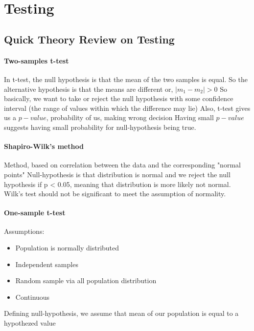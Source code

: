 \documentclass{article}
\begin{document}
\section{Testing}



\subsection{Quick Theory Review on Testing}
\paragraph{Two-samples t-test\newline}
In t-test, the null hypothesis is that the mean of the two samples is equal.
So the alternative hypothesis is that the means are different or, \(|m_1 - m_2| > 0\)
So basically, we want to take or reject the null hypothesis with some confidence interval (the range of values within which the difference may lie)
Also, t-test gives us a \(p-value\), probability of us, making wrong decision
Having small \(p-value\) suggests having small probability for null-hypothesis being true.

\paragraph{Shapiro-Wilk’s method\newline}
Method, based on correlation between the data and the corresponding "normal points"
Null-hypothesis is that distribution is normal and we reject the null hypothesis if p < 0.05, meaning that distribution is more likely not normal.
Wilk’s test should not be significant to meet the assumption of normality.

\paragraph{One-sample t-test\newline}
Assumptions:
\begin{itemize}
  \item Population is normally distributed
  \item Independent samples
  \item Random sample via all population distribution
  \item Continuous
  \end{itemize}
Defining null-hypothesis, we assume that mean of our population is equal to a hypothezed value
\end{document}

